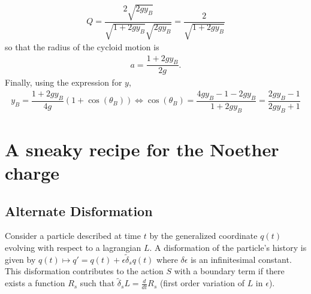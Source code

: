 \documentclass[12pt, a4paper]{article}
\begin{document}
\begin{align*}
    Q =\dfrac{2\sqrt{2g y_B}}{\sqrt{1 + 2g y_B}\sqrt{2gy_B}}=\dfrac{2}{\sqrt{1 + 2g y_B}}
\end{align*}
so that the radius of the cycloid motion is 
\begin{align*}
    a = \dfrac{1 + 2g y_B}{2g}.
\end{align*}
Finally, using the expression for $y$, 
\begin{align*}
    y_B = \dfrac{1 + 2g y_B}{4g}(1 + \cos(\theta_B)) \iff \cos(\theta_B) = \dfrac{4gy_B - 1 - 2g y_B}{1 + 2g y_B} = \dfrac{2gy_B - 1}{2g y_B + 1} 
\end{align*} 





\newpage

\section{A sneaky recipe for the Noether charge}
%
\subsection{Alternate Disformation}
Consider a particle described at time $t$ by the generalized coordinate $q(t)$ evolving with respect to a lagrangian $L$. A disformation of the particle's history is given by $q(t) \mapsto q' = q(t) +\epsilon \tilde{\delta}_s q(t)$ where $\delta \epsilon$ is an infinitesimal constant. This disformation contributes to the action $S$ with a boundary term if there exists a function $R_s$ such that $\tilde{\delta}_s L = \frac{d}{dt}R_s$ (first order variation of $L$ in $\epsilon$).
\end{document}
